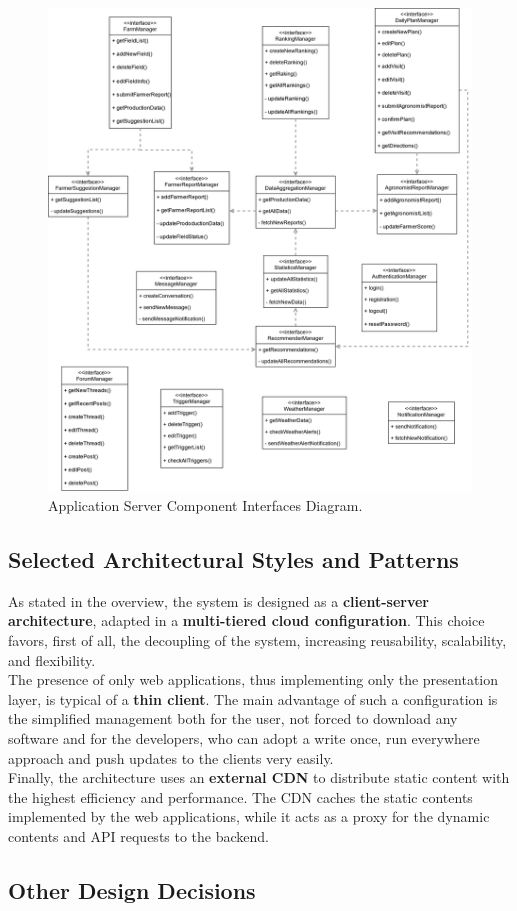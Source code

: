 \begin{figure}[hbt!]
\centering
\includegraphics[width=\textwidth]{../images_diagrams/dd/component_interfaces_diagram.png}
\caption{Application Server Component Interfaces Diagram.}
\label{fig:componentInterface}
\end{figure}

\subsection{Selected Architectural Styles and Patterns}
As stated in the overview, the system is designed as a \textbf{client-server architecture}, adapted in a \textbf{multi-tiered cloud configuration}. This choice favors, first of all, the decoupling of the system, increasing reusability, scalability, and flexibility.\smallskip \\
The presence of only web applications, thus implementing only the presentation layer, is typical of a \textbf{thin client}. The main advantage of such a configuration is the simplified management both for the user, not forced to download any software and for the developers, who can adopt a write once, run everywhere approach and push updates to the clients very easily.\smallskip \\
Finally, the architecture uses an \textbf{external CDN} to distribute static content with the highest efficiency and performance. The CDN caches the static contents implemented by the web applications, while it acts as a proxy for the dynamic contents and API requests to the backend.\\

\subsection{Other Design Decisions}